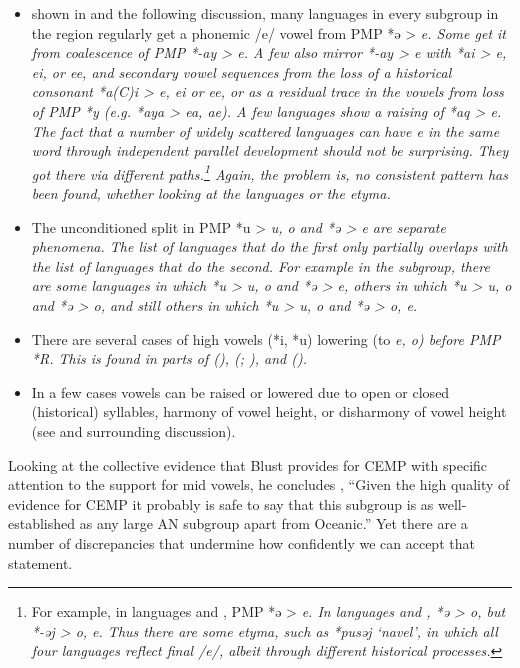 \begin{itemize}
				word should not be surprising.
				An equal number of languages do not.
				The problem is, no consistent pattern has been found,
				so we are not dealing with regular sound correspondences in the rigorous scientific sense.
	\item	{} shown in 
				and the following discussion,
				many languages in every subgroup in the region regularly get
				a phonemic /e/ vowel from PMP *ə > \it{e}.
				Some get it from coalescence of PMP *-ay > \it{e}.
				A few also mirror *-ay > \it{e} with *ai > \it{e,
				ei,} or \it{ee}, and secondary vowel sequences from the loss
				of a historical consonant *a(C)i > \it{e,
				ei} or \it{ee}, or as a residual trace in the vowels from loss
				of PMP *y (e.g.
				*aya > \it{ea, ae}).
				A few languages show a raising of *aq > \it{e}.
				The fact that a number of widely scattered languages can have
				\it{e} in the same word through independent parallel development
				should not be surprising.
				They got there via different paths.\footnote{
						For example,
						in  languages 
						and , PMP *ə > \it{e}.
						In  languages 
						and , *ə > \it{o}, but *-əj > \it{o}, \it{e}.
						Thus there are some etyma,
						such as *pusəj ‘navel’,
						in which all four languages reflect final /e/,
						albeit through different historical processes.}
				Again,
				the problem is, no consistent pattern has been found,
				whether looking at the languages or the etyma.
	\item	The unconditioned split in PMP *u > \it{u,
				o} and *ə > \it{e} are separate phenomena.
				The list of languages that do the first only partially overlaps
				with the list of languages that do the second.
				For example in the  subgroup,
				there are some languages in which *u > \it{u, o}
				and *ə > \it{e}, others in which *u > \it{u, o}
				and *ə > \it{o}, and still others in which *u > \it{u, o}
				and *ə > \it{o, e}.
	\item	There are several cases of high vowels (*i,
				*u) lowering (to \it{e, o}) before PMP *R.
				This is found in parts of  (),
				 (; \citealp[84f]{Edwards2021}),
				and  ().
	\item	In a few cases vowels can be raised or lowered due to open
				or closed (historical) syllables,
				harmony of vowel height,
				or disharmony of vowel height (see  and surrounding discussion).
\end{itemize}

Looking at the collective evidence that Blust provides for CEMP
with specific attention to the support for mid vowels,
he concludes \citeyear[740]{Blust2013}, “Given the high quality of evidence
for CEMP it probably is safe to say that this subgroup is as
well-established as any large AN subgroup apart from Oceanic.”
Yet there are a number of discrepancies that undermine how confidently
we can accept that statement.